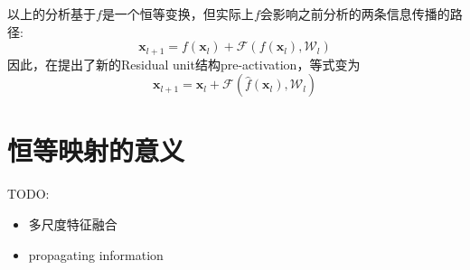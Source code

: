 以上的分析基于$f$是一个恒等变换，但实际上$f$会影响之前分析的两条信息传播的路径:
\begin{equation}
    \mathbf{x}_{l+1} = f(\mathbf{x}_l) + \mathcal{F}(f(\mathbf{x}_l), \mathcal{W}_l)
\end{equation}
因此，在\cite{He2016identity}提出了新的Residual unit结构pre-activation，等式变为
\begin{equation}
    \mathbf{x}_{l+1} = \mathbf{x}_l + \mathcal{F}(\hat f(\mathbf{x}_l), \mathcal{W}_l)
\end{equation}


\section{恒等映射的意义}
TODO:
\begin{itemize}
    \item 多尺度特征融合
    \item propagating information
\end{itemize}